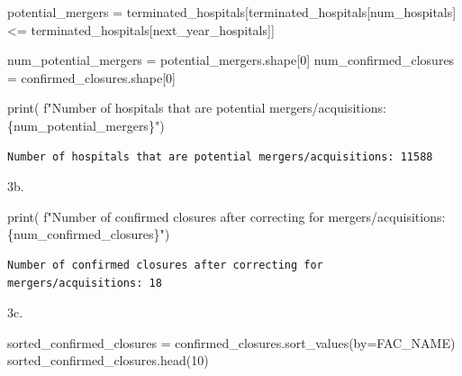 \documentclass[
  letterpaper,
  DIV=11,
  numbers=noendperiod]{scrartcl}
\newenvironment{Shaded}{\begin{snugshade}}{\end{snugshade}}
\newcommand{\BuiltInTok}[1]{\textcolor[rgb]{0.00,0.23,0.31}{#1}}
\newcommand{\DecValTok}[1]{\textcolor[rgb]{0.68,0.00,0.00}{#1}}
\newcommand{\NormalTok}[1]{\textcolor[rgb]{0.00,0.23,0.31}{#1}}
\newcommand{\OperatorTok}[1]{\textcolor[rgb]{0.37,0.37,0.37}{#1}}
\newcommand{\SpecialCharTok}[1]{\textcolor[rgb]{0.37,0.37,0.37}{#1}}
\newcommand{\SpecialStringTok}[1]{\textcolor[rgb]{0.13,0.47,0.30}{#1}}
\newcommand{\StringTok}[1]{\textcolor[rgb]{0.13,0.47,0.30}{#1}}
\begin{document}
\begin{Shaded}
\begin{Highlighting}[]
\NormalTok{potential\_mergers }\OperatorTok{=}\NormalTok{ terminated\_hospitals[terminated\_hospitals[}\StringTok{\textquotesingle{}num\_hospitals\textquotesingle{}}\NormalTok{]}
                                         \OperatorTok{\textless{}=}\NormalTok{ terminated\_hospitals[}\StringTok{\textquotesingle{}next\_year\_hospitals\textquotesingle{}}\NormalTok{]]}

\NormalTok{num\_potential\_mergers }\OperatorTok{=}\NormalTok{ potential\_mergers.shape[}\DecValTok{0}\NormalTok{]}
\NormalTok{num\_confirmed\_closures }\OperatorTok{=}\NormalTok{ confirmed\_closures.shape[}\DecValTok{0}\NormalTok{]}

\BuiltInTok{print}\NormalTok{(}
    \SpecialStringTok{f"Number of hospitals that are potential mergers/acquisitions: }\SpecialCharTok{\{}\NormalTok{num\_potential\_mergers}\SpecialCharTok{\}}\SpecialStringTok{"}\NormalTok{)}
\end{Highlighting}
\end{Shaded}

\begin{verbatim}
Number of hospitals that are potential mergers/acquisitions: 11588
\end{verbatim}

3b.

\begin{Shaded}
\begin{Highlighting}[]
\BuiltInTok{print}\NormalTok{(}
    \SpecialStringTok{f"Number of confirmed closures after correcting for mergers/acquisitions: }\SpecialCharTok{\{}\NormalTok{num\_confirmed\_closures}\SpecialCharTok{\}}\SpecialStringTok{"}\NormalTok{)}
\end{Highlighting}
\end{Shaded}

\begin{verbatim}
Number of confirmed closures after correcting for mergers/acquisitions: 18
\end{verbatim}

3c.

\begin{Shaded}
\begin{Highlighting}[]
\NormalTok{sorted\_confirmed\_closures }\OperatorTok{=}\NormalTok{ confirmed\_closures.sort\_values(by}\OperatorTok{=}\StringTok{\textquotesingle{}FAC\_NAME\textquotesingle{}}\NormalTok{)}
\NormalTok{sorted\_confirmed\_closures.head(}\DecValTok{10}\NormalTok{)}
\end{Highlighting}
\end{Shaded}
\end{document}
